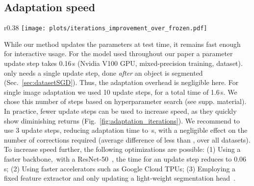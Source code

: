 \subsection{Adaptation speed}
\begin{wrapfigure}{r}{0.38\linewidth}
    \centering
    \texttt{[image: plots/iterations\_improvement\_over\_frozen.pdf]}
    \caption{Iterations \vs relative improvement over a \fixedmodellong{} (mean over all datasets).}
    \label{fig:adaptation_iterations}
\end{wrapfigure}
While our method updates the parameters at test time, it remains fast enough for interactive usage.
For the model used throughout our paper a parameter update step takes 0.16\,s (Nvidia V100 GPU, mixed-precision training, \berkeley{} dataset).
\uc\datasetSGD{} only needs a single update step, done \emph{after} an object is segmented (Sec.~\ref{sec:datasetSGD}).
Thus, the adaptation overhead is negligible here.
For single image adaptation we used 10 update steps, 
for a total time of 1.6\,s.
We chose this number of steps based on hyperparameter search (see supp. material).
In practice, fewer update steps can be used to increase speed,
as they quickly show diminishing returns (Fig.~\ref{fig:adaptation_iterations}). 
We recommend to use 3 update steps, reducing adaptation time to \,s, with a negligible effect on the number of corrections required (average difference of less than , over all datasets).
\newline
\hspace{\parindent}
To increase speed further, the following optimizations are possible:
(1) Using a faster backbone,~\eg with a ResNet-50~\cite{he15arxiv}, the time for an update step reduces to 0.06\,s;
(2) Using faster accelerators such as Google Cloud TPUs;
(3) Employing a fixed feature extractor and only updating a light-weight segmentation head~\cite{li18cvpr}.

